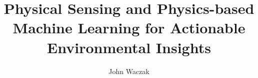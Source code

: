 \documentclass[doublespacing]{utdthesis}
\author{John Waczak}
\title{Physical Sensing and Physics-based Machine Learning for Actionable Environmental Insights}
\begin{document}
\frontmatter

\signaturepage



\maketitle






\tableofcontents
\listoffigures %
\listoftables %

\mainmatter




%













% 






\appendix %




\begin{thesisbib}  %
  
\end{thesisbib}  %
\end{document}
